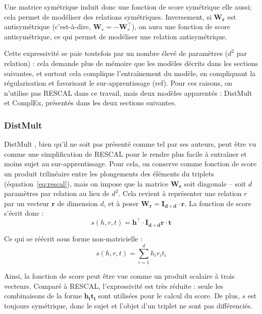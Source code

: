 Une matrice symétrique induit donc une fonction de score symétrique elle aussi; cela permet de modéliser des relations symétriques. Inversement, si $\mathbf{W_r}$ est antisymétrique (c'est-à-dire, $\mathbf{W}_r = -\mathbf{W}_r^\top$), on aura une fonction de score antisymétrique, ce qui permet de modéliser une relation antisymétrique.

Cette expressivité se paie toutefois par un nombre élevé de paramètres ($d^2$ par relation) : cela demande plus de mémoire que les modèles décrits dans les sections suivantes, et surtout cela complique l'entraînement du modèle, en compliquant la régularisation et favorisant le sur-apprentissage (ref). Pour ces raisons, on n'utilise pas RESCAL dans ce travail, mais deux modèles apparentés : DistMult et ComplEx, présentés dans les deux sections suivantes.

\subsubsection{DistMult}

DistMult \cite{distmult}, bien qu'il ne soit pas présenté comme tel par ses auteurs, peut être vu comme une simplification de RESCAL pour le rendre plus facile à entraîner et moins sujet au sur-apprentissage. Pour cela, on conserve comme fonction de score un produit trilinéaire entre les plongements des éléments du triplets  (équation~\ref{eq:rescal}), mais on impose que la matrice $\mathbf{W_r}$ soit diagonale – soit $d$ paramètres par relation au lieu de $d^2$. Cela revient à représenter une relation $r$ par un vecteur $\mathbf{r}$ de dimension $d$, et à poser $\mathbf{W_r = I_{d\times d} \cdot r}$. La fonction de score s'écrit donc :
\begin{equation}
    \label{eq:distmult}
    s(h, r, t) = \mathbf{h^\top \cdot I_{d\times d}r \cdot t}
\end{equation}

Ce qui se réécrit sous forme non-matricielle :
\begin{equation}
    s(h, r, t) = \sum_{i=1}^{d} h_i r_i t_i
    \label{eq:kge-distmult-scorenv}
\end{equation}

Ainsi, la fonction de score peut être vue comme un produit scalaire à trois vecteurs. Comparé à RESCAL, l'expressivité est très réduite : seule les combinaisons de la forme $\mathbf{h_i t_i}$ sont utilisées pour le calcul du score. De plus, $s$ est toujours symétrique, donc le sujet et l'objet d'un triplet ne sont pas différenciés.

